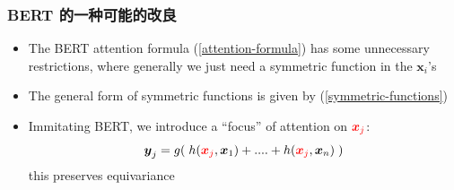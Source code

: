 \documentclass[16pt]{beamer}
\newcommand{\cc}[2]{#1}
\newcommand{\cc}[2]{#2}
\newcommand{\emp}[1]{{\color{violet}#1}}
\newcommand{\vect}[1]{\boldsymbol{#1}}
\begin{document}
\begin{frame}
\frametitle{\cc{BERT 的一种可能的改良}{A possible improvement of BERT}}
\begin{itemize}
	\item The BERT attention formula (\ref{attention-formula}) has some unnecessary restrictions, where generally we just need a symmetric function in the $\vect{x}_i$'s
	
	\item The general form of symmetric functions is given by (\ref{symmetric-functions})
	
	\item Immitating BERT, we introduce a ``focus'' of attention on ${\color{red}\vect{x}_j}$:
	\begin{equation}
	\vect{y}_j = g( \; h({\color{red}\vect{x}_j}, \vect{x}_1) + .... + h({\color{red}\vect{x}_j}, \vect{x}_n) \; )
	\end{equation}
	this preserves \emp{equivariance}
	

\end{itemize}
\end{frame}
\end{document}
